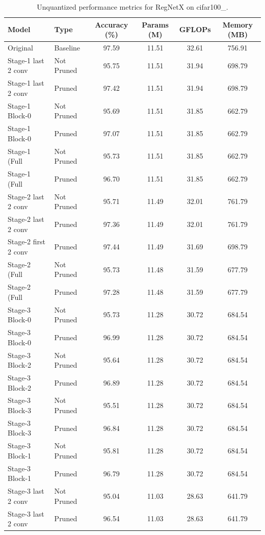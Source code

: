 \begin{table}
\caption{Unquantized performance metrics for RegNetX on cifar100_.}
\label{tab:RegNetX_cifar100__unquant}
\begin{tabular}{llcccc}
\toprule
Model & Type & Accuracy (\%) & Params (M) & GFLOPs & Memory (MB) \\
\midrule
Original & Baseline & 97.59 & 11.51 & 32.61 & 756.91 \\
Stage-1 last 2 conv & Not Pruned & 95.75 & 11.51 & 31.94 & 698.79 \\
Stage-1 last 2 conv & Pruned & 97.42 & 11.51 & 31.94 & 698.79 \\
Stage-1 Block-0 & Not Pruned & 95.69 & 11.51 & 31.85 & 662.79 \\
Stage-1 Block-0 & Pruned & 97.07 & 11.51 & 31.85 & 662.79 \\
Stage-1 (Full & Not Pruned & 95.73 & 11.51 & 31.85 & 662.79 \\
Stage-1 (Full & Pruned & 96.70 & 11.51 & 31.85 & 662.79 \\
Stage-2 last 2 conv & Not Pruned & 95.71 & 11.49 & 32.01 & 761.79 \\
Stage-2 last 2 conv & Pruned & 97.36 & 11.49 & 32.01 & 761.79 \\
Stage-2 first 2 conv & Pruned & 97.44 & 11.49 & 31.69 & 698.79 \\
Stage-2 (Full & Not Pruned & 95.73 & 11.48 & 31.59 & 677.79 \\
Stage-2 (Full & Pruned & 97.28 & 11.48 & 31.59 & 677.79 \\
Stage-3 Block-0 & Not Pruned & 95.73 & 11.28 & 30.72 & 684.54 \\
Stage-3 Block-0 & Pruned & 96.99 & 11.28 & 30.72 & 684.54 \\
Stage-3 Block-2 & Not Pruned & 95.64 & 11.28 & 30.72 & 684.54 \\
Stage-3 Block-2 & Pruned & 96.89 & 11.28 & 30.72 & 684.54 \\
Stage-3 Block-3 & Not Pruned & 95.51 & 11.28 & 30.72 & 684.54 \\
Stage-3 Block-3 & Pruned & 96.84 & 11.28 & 30.72 & 684.54 \\
Stage-3 Block-1 & Not Pruned & 95.81 & 11.28 & 30.72 & 684.54 \\
Stage-3 Block-1 & Pruned & 96.79 & 11.28 & 30.72 & 684.54 \\
Stage-3 last 2 conv & Not Pruned & 95.04 & 11.03 & 28.63 & 641.79 \\
Stage-3 last 2 conv & Pruned & 96.54 & 11.03 & 28.63 & 641.79 \\

\end{tabular}
\end{table}
